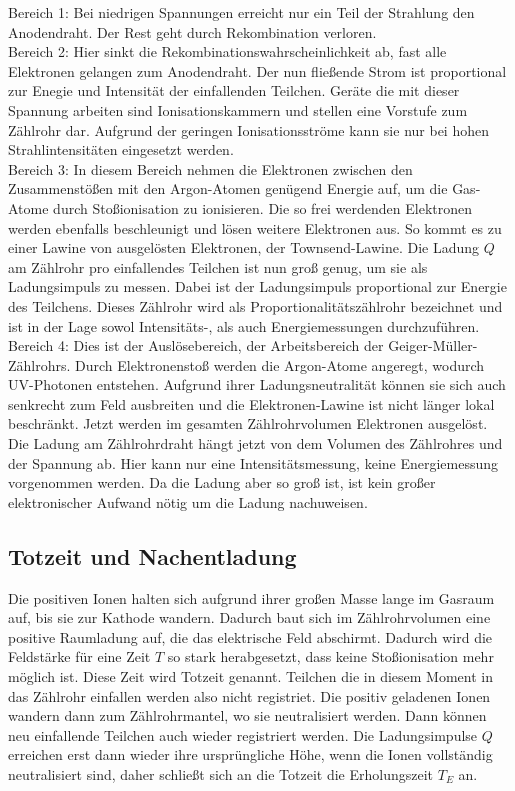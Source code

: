 Bereich 1: Bei niedrigen Spannungen erreicht nur ein Teil der Strahlung den Anodendraht.
Der Rest geht durch Rekombination verloren.\\

Bereich 2: Hier sinkt die Rekombinationswahrscheinlichkeit ab, fast alle
Elektronen gelangen zum Anodendraht. Der nun fließende Strom ist proportional
zur Enegie und Intensität der einfallenden Teilchen. Geräte die mit dieser
Spannung arbeiten sind Ionisationskammern und stellen eine Vorstufe zum
Zählrohr dar. Aufgrund der geringen Ionisationsströme kann sie nur bei hohen
Strahlintensitäten eingesetzt werden.\\

Bereich 3: In diesem Bereich nehmen die Elektronen zwischen den Zusammenstößen mit
den Argon-Atomen genügend Energie auf, um die Gas-Atome durch Stoßionisation zu
ionisieren. Die so frei werdenden Elektronen werden ebenfalls beschleunigt und
lösen weitere Elektronen aus. So kommt es zu einer Lawine von ausgelösten
Elektronen, der Townsend-Lawine. Die Ladung $Q$ am Zählrohr pro einfallendes Teilchen ist
nun groß genug, um sie als Ladungsimpuls zu messen.
Dabei ist der Ladungsimpuls proportional zur Energie des Teilchens.
Dieses Zählrohr wird als Proportionalitätszählrohr bezeichnet und ist in der Lage
sowol Intensitäts-, als auch Energiemessungen durchzuführen.\\

Bereich 4: Dies ist der Auslösebereich, der Arbeitsbereich der Geiger-Müller-Zählrohrs.
Durch Elektronenstoß werden die Argon-Atome angeregt, wodurch UV-Photonen entstehen. Aufgrund
ihrer Ladungsneutralität können sie sich auch senkrecht zum Feld ausbreiten und die
Elektronen-Lawine ist nicht länger lokal beschränkt. Jetzt werden im gesamten
Zählrohrvolumen Elektronen ausgelöst. Die Ladung am Zählrohrdraht hängt jetzt von
dem Volumen des Zählrohres und der Spannung ab. Hier kann nur eine Intensitätsmessung, keine
Energiemessung vorgenommen werden. Da die Ladung aber so groß ist, ist kein großer
elektronischer Aufwand nötig um die Ladung nachuweisen.\\

\subsection{Totzeit und Nachentladung}
Die positiven Ionen halten sich aufgrund ihrer großen Masse lange im Gasraum auf, bis
sie zur Kathode wandern. Dadurch baut sich im Zählrohrvolumen eine positive
Raumladung auf, die das elektrische Feld abschirmt. Dadurch wird die Feldstärke
für eine Zeit $T$ so stark herabgesetzt, dass keine Stoßionisation mehr
möglich ist. Diese Zeit wird Totzeit genannt. Teilchen die in diesem Moment in das
Zählrohr einfallen werden also nicht registriet. Die positiv geladenen Ionen wandern dann
zum Zählrohrmantel, wo sie neutralisiert werden. Dann können neu einfallende Teilchen auch
wieder registriert werden. Die Ladungsimpulse $Q$ erreichen erst dann wieder ihre
ursprüngliche Höhe, wenn die Ionen vollständig neutralisiert sind, daher schließt sich an
die Totzeit die Erholungszeit $T_E$ an.

